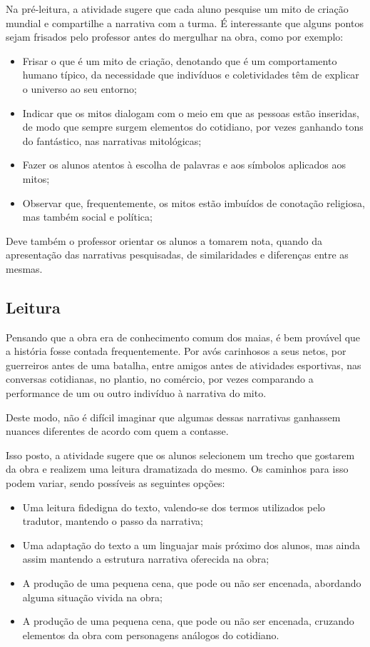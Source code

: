 \documentclass[12pt]{extarticle}
\begin{document}
Na pré-leitura, a atividade sugere que cada aluno pesquise um mito de
criação mundial e compartilhe a narrativa com a turma. É interessante
que alguns pontos sejam frisados pelo professor antes do mergulhar na
obra, como por exemplo:

\begin{itemize}
\item
  Frisar o que é um mito de criação, denotando que é um comportamento
  humano típico, da necessidade que indivíduos e coletividades têm de
  explicar o universo ao seu entorno;
\item
  Indicar que os mitos dialogam com o meio em que as pessoas estão
  inseridas, de modo que sempre surgem elementos do cotidiano, por vezes
  ganhando tons do fantástico, nas narrativas mitológicas;
\item
  Fazer os alunos atentos à escolha de palavras e aos símbolos aplicados
  aos mitos;
\item
  Observar que, frequentemente, os mitos estão imbuídos de conotação
  religiosa, mas também social e política;
\end{itemize}

Deve também o professor orientar os alunos a tomarem nota, quando da
apresentação das narrativas pesquisadas, de similaridades e diferenças
entre as mesmas.

\subsection{Leitura}


Pensando que a obra era de conhecimento comum dos maias, é
bem provável que a história fosse contada frequentemente. Por avós
carinhosos a seus netos, por guerreiros antes de uma batalha, entre
amigos antes de atividades esportivas, nas conversas cotidianas, no
plantio, no comércio, por vezes comparando a performance de um ou outro
indivíduo à narrativa do mito.

Deste modo, não é difícil imaginar que algumas dessas narrativas
ganhassem nuances diferentes de acordo com quem a contasse.

Isso posto, a atividade sugere que os alunos selecionem um trecho que
gostarem da obra e realizem uma leitura dramatizada do mesmo. Os
caminhos para isso podem variar, sendo possíveis as seguintes opções:

\begin{itemize}
\item
  Uma leitura fidedigna do texto, valendo-se dos termos utilizados pelo
  tradutor, mantendo o passo da narrativa;
\item
  Uma adaptação do texto a um linguajar mais próximo dos alunos, mas
  ainda assim mantendo a estrutura narrativa oferecida na obra;
\item
  A produção de uma pequena cena, que pode ou não ser encenada,
  abordando alguma situação vivida na obra;
\item
  A produção de uma pequena cena, que pode ou não ser encenada, cruzando
  elementos da obra com personagens análogos do cotidiano.
\end{itemize}
\end{document}
